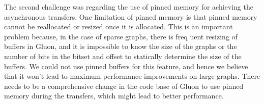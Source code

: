 The second challenge was regarding the use of pinned memory for achieving the asynchronous transfers. One limitation of pinned memory is that pinned memory cannot be reallocated or resized once it is allocated. This is an important problem because, in the case of sparse graphs, there is freq	uent resizing of buffers in Gluon, and it is impossible to know the size of the graphs or the number of bits in the bitset and offset to statically determine the size of the buffers. We could not use pinned buffers for this feature, and hence we believe that it won't lead to maximum performance improvements on large graphs. There needs to be a comprehensive change in the code base of Gluon to use pinned memory during the transfers, which might lead to better performance. 





